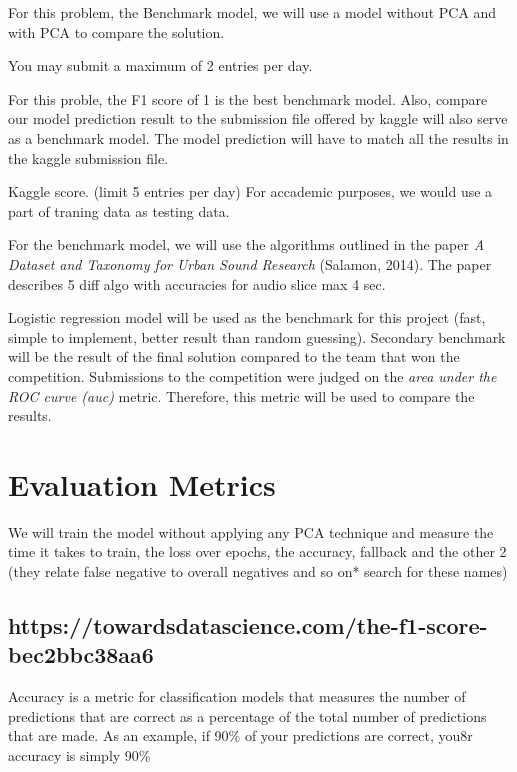 For this problem, the Benchmark model, we will use a model without PCA
and with PCA to compare the solution.

You may submit a maximum of 2 entries per day.

For this proble, the F1 score of 1 is the best benchmark model. Also,
compare our model prediction result to the submission file offered by
kaggle will also serve as a benchmark model. The model prediction will
have to match all the results in the kaggle submission file.

Kaggle score. (limit 5 entries per day) For accademic purposes, we would
use a part of traning data as testing data.

For the benchmark model, we will use the algorithms outlined in the
paper \emph{A Dataset and Taxonomy for Urban Sound Research} (Salamon,
2014). The paper describes 5 diff algo with accuracies for audio slice
max 4 sec.

Logistic regression model will be used as the benchmark for this project
(fast, simple to implement, better result than random guessing).
Secondary benchmark will be the result of the final solution compared to
the team that won the competition. Submissions to the competition were
judged on the \emph{area under the ROC curve (auc)} metric. Therefore,
this metric will be used to compare the results.

\hypertarget{evaluation-metrics}{%
\section{Evaluation Metrics}\label{evaluation-metrics}}

We will train the model without applying any PCA technique and measure
the time it takes to train, the loss over epochs, the accuracy, fallback
and the other 2 (they relate false negative to overall negatives and so
on* search for these names)

\hypertarget{httpstowardsdatascience.comthe-f1-score-bec2bbc38aa6}{%
\subsection{https://towardsdatascience.com/the-f1-score-bec2bbc38aa6}\label{httpstowardsdatascience.comthe-f1-score-bec2bbc38aa6}}

Accuracy is a metric for classification models that measures the number
of predictions that are correct as a percentage of the total number of
predictions that are made. As an example, if 90\% of your predictions
are correct, you8r accuracy is simply 90\%


